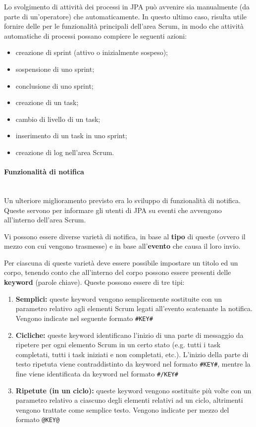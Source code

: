 Lo svolgimento di attività dei processi in JPA può avvenire sia manualmente
(da parte di un'operatore) che automaticamente. In questo ultimo caso, risulta
utile fornire delle  per le funzionalità principali dell'area Scrum,
in modo che attività automatiche di processi possano compiere le seguenti
azioni:

\begin{itemize}
\item creazione di sprint (attivo o inizialmente sospeso);
\item sospensione di uno sprint;
\item conclusione di uno sprint;
\item creazione di un task;
\item cambio di livello di un task;
\item inserimento di un task in uno sprint;
\item creazione di log nell'area Scrum.
\end{itemize}

\paragraph{Funzionalità di notifica} \mbox{} \\

Un ulteriore miglioramento previsto era lo sviluppo di funzionalità di
notifica. Queste servono per informare gli utenti di JPA su eventi che
avvengono all'interno dell'area Scrum.

Vi possono essere diverse varietà di notifica, in base al \textbf{tipo} di
queste (ovvero il mezzo con cui vengono trasmesse) e in base
all'\textbf{evento} che causa il loro invio.

Per ciascuna di queste varietà deve essere possibile impostare un titolo ed un
corpo, tenendo conto che all'interno del corpo possono essere presenti delle
\textbf{keyword} (parole chiave). Queste possono essere di tre tipi:

\begin{enumerate}
\item \textbf{Semplici:} queste keyword vengono semplicemente sostituite con un
  parametro relativo agli elementi Scrum legati all'evento scatenante la
  notifica. Vengono indicate nel seguente formato \texttt{\#KEY\#}
\item \textbf{Cicliche:} queste keyword identificano l'inizio di una parte di
  messaggio da ripetere per ogni elemento Scrum in un certo stato (e.g. tutti
  i task completati, tutti i task iniziati e non completati, etc.). L'inizio
  della parte di testo ripetuta viene contraddistinto da keyword nel formato
  \texttt{\#KEY\#}, mentre la fine viene identificata da keyword nel formato
  \texttt{\#/KEY\#}
\item \textbf{Ripetute (in un ciclo):} queste keyword vengono sostituite più
  volte con un parametro relativo a ciascuno degli elementi relativi ad un
  ciclo, altrimenti vengono trattate come semplice testo. Vengono indicate per
  mezzo del formato \texttt{@KEY@}
\end{enumerate}

